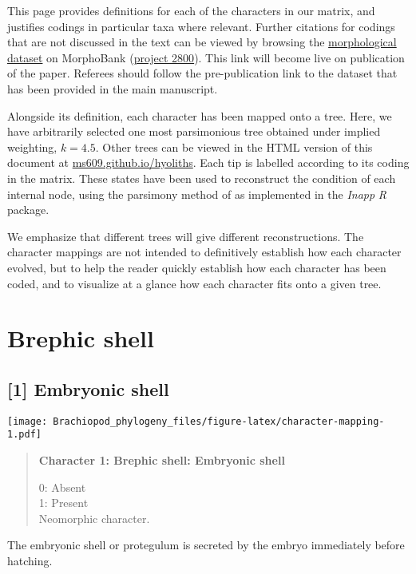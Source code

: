 \documentclass[openany]{book}
\theoremstyle{definition}
\theoremstyle{definition}
\theoremstyle{definition}
\theoremstyle{remark}
\begin{document}
This page provides definitions for each of the characters in our matrix,
and justifies codings in particular taxa where relevant. Further
citations for codings that are not discussed in the text can be viewed
by browsing the \protect\hyperlink{dataset}{morphological dataset} on
MorphoBank (\href{https://morphobank.org/permalink/?P2800}{project
2800}). This link will become live on publication of the paper. Referees
should follow the pre-publication link to the dataset that has been
provided in the main manuscript.

Alongside its definition, each character has been mapped onto a tree.
Here, we have arbitrarily selected one most parsimonious tree obtained
under implied weighting, \(k = 4.5\). Other trees can be viewed in the
HTML version of this document at
\href{https://ms609.github.io/hyoliths/reconstructions.html}{ms609.github.io/hyoliths}.
Each tip is labelled according to its coding in the matrix. These states
have been used to reconstruct the condition of each internal node, using
the parsimony method of \citet{Brazeau2018} as implemented in the
\emph{Inapp} \emph{R} package.

We emphasize that different trees will give different reconstructions.
The character mappings are not intended to definitively establish how
each character evolved, but to help the reader quickly establish how
each character has been coded, and to visualize at a glance how each
character fits onto a given tree.

\section{Brephic shell}\label{brephic-shell}

\subsection*{{[}1{]} Embryonic shell}\label{embryonic-shell}

\texttt{[image: Brachiopod\_phylogeny\_files/figure-latex/character-mapping-1.pdf]}

\begin{quote}
\textbf{Character 1: Brephic shell: Embryonic shell}

0: Absent\\
1: Present\\
Neomorphic character.
\end{quote}

The embryonic shell or protegulum is secreted by the embryo immediately
before hatching.
\end{document}
